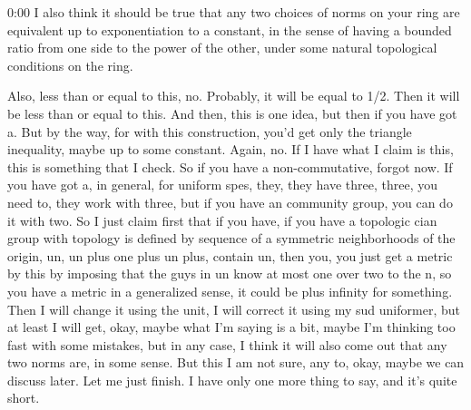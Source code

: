\begin{unfinished}{0:00}
I also think it should be true that any two choices of norms on your ring are equivalent up to exponentiation to a constant, in the sense of having a bounded ratio from one side to the power of the other, under some natural topological conditions on the ring.

Also, less than or equal to this, no. Probably, it will be equal to 1/2. Then it will be less than or equal to this. And then, this is one idea, but then if you have got a. But by the way, for with this construction, you'd get only the triangle inequality, maybe up to some constant. Again, no. If I have what I claim is this, this is something that I check. So if you have a non-commutative, forgot now. If you have got a, in general, for uniform spes, they, they have three, three, you need to, they work with three, but if you have an community group, you can do it with two. So I just claim first that if you have, if you have a topologic cian group with topology is defined by sequence of a symmetric neighborhoods of the origin, un, un plus one plus un plus, contain un, then you, you just get a metric by this by imposing that the guys in un know at most one over two to the n, so you have a metric in a generalized sense, it could be plus infinity for something. Then I will change it using the unit, I will correct it using my sud uniformer, but at least I will get, okay, maybe what I'm saying is a bit, maybe I'm thinking too fast with some mistakes, but in any case, I think it will also come out that any two norms are, in some sense. But this I am not sure, any to, okay, maybe we can discuss later. Let me just finish. I have only one more thing to say, and it's quite short.


\end{unfinished}
